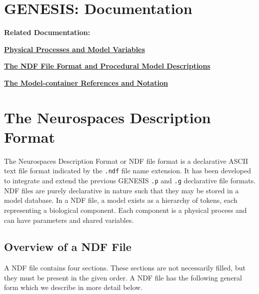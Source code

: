 \documentclass[12pt]{article}
\begin{document}
\section*{GENESIS: Documentation}

{\bf Related Documentation:}

\href{../model-variables/model-variables.tex}{\bf Physical Processes and Model Variables}

\href{../ndf-procedural-description/ndf-procedural-description.tex}{\bf The NDF File Format and Procedural Model Descriptions}

\href{../ndf-namespaces/ndf-namespaces.tex}{\bf The Model-container References and  Notation}


\section*{The Neurospaces Description Format}

The Neurospaces Description Format or NDF file format is a declarative ASCII text file format indicated by the {\tt .ndf} file name extension. It has been developed to integrate and extend the previous GENESIS {\tt .p} and {\tt .g} declarative file formats. NDF files are purely declarative in nature such that they may be stored in a model database. In a NDF file, a model exists as a hierarchy of tokens, each representing a biological component. Each component is a physical process and can have parameters and shared variables. 

\subsection*{Overview of a NDF File}
\label{sec:overview-ndf-file}
A NDF file contains four sections. These sections are not necessarily
filled, but they must be present in the given order.  A NDF file has
the following general form which we describe in more detail below.
\end{document}
